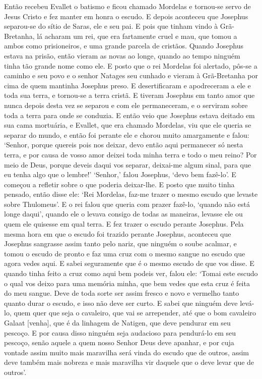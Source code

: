 Então recebeu Evallet o batismo e ficou chamado Mordelas e tornou-se servo de
Jesus Cristo e fez manter em honra o escudo. E depois aconteceu que Josephus
separou-se do sítio de Saras, ele e seu pai. E pois que tinham vindo à
Grã-Bretanha, lá acharam um rei, que era fartamente cruel e mau, que tomou a
ambos como prisioneiros, e uma grande parcela de cristãos. Quando Josephus
estava na prisão, então vieram as novas ao longe, quando ao tempo ninguém tinha
tão grande nome como ele. E posto que o rei Mordelas foi alertado, pôs-se a
caminho e seu povo e o senhor Natages seu cunhado e vieram à Grã-Bretanha por
cima de quem mantinha Josephus preso. E desertificaram e apodreceram a ele e
toda sua terra, e tornou-se a terra cristã. E tiveram Josephus em tanto amor
que nunca depois desta vez se separou e com ele permaneceram, e o serviram
sobre toda a terra para onde se conduzia. E então veio que Josephus estava
deitado em sua cama mortuária, e Evallet, que era chamado Mordelas, viu que ele
queria se separar do mundo, e então foi perante ele e chorou muito amargamente
e falou: ‘Senhor, porque quereis pois nos deixar, devo então aqui permanecer só
nesta terra, e por causa de vosso amor  deixei toda minha terra e todo o meu
reino? Por meio de Deus, porque deveis daqui vos separar, deixai-me algum
sinal, para que eu tenha algo que o lembre!’ ‘Senhor,’ falou Josephus, ‘devo
bem fazê-lo’. E começou a refletir sobre o que poderia deixar-lhe. E posto que
muito tinha pensado, então disse ele: ‘Rei Mordelas, faz-me trazer o mesmo
escudo que levaste sobre Thulomeus’. E o rei falou que queria com prazer
fazê-lo, ‘quando não está longe daqui’, quando ele o levava consigo de todas as
maneiras, levasse ele ou quem ele quisesse em qual terra. E fez trazer o escudo
perante Josephus. Pela mesma hora em que o escudo foi trazido perante Josephus,
aconteceu que Josephus sangrasse assim tanto pelo nariz, que ninguém o soube
acalmar, e tomou o escudo de pronto e faz uma cruz com o mesmo sangue no escudo
que agora vedes aqui. E sabei seguramente que é o mesmo escudo de que vos
disse. E quando tinha feito a cruz como aqui bem podeis ver, falou ele: ‘Tomai
este escudo o qual vos deixo para uma memória minha, que bem vedes que esta
cruz é feita do meu sangue. Deve de toda sorte ser assim fresco e novo e
vermelho tanto quanto durar o escudo, e isso não deve ser curto. E sabei que
ninguém deve levá-lo, quem quer que seja o cavaleiro, que vai se arrepender,
até que o bom cavaleiro Galaat [venha], que é da linhagem de Natigen, que deve
pendurar em seu pescoço. E por causa disso ninguém seja audacioso para
pendurá-lo em seu pescoço, senão aquele a quem nosso Senhor Deus  deve apanhar,
e por cuja vontade assim muito mais maravilha será vinda do escudo que de
outros, assim deve também mais nobreza e mais maravilha vir daquele que o deve
levar que de outros’. 

